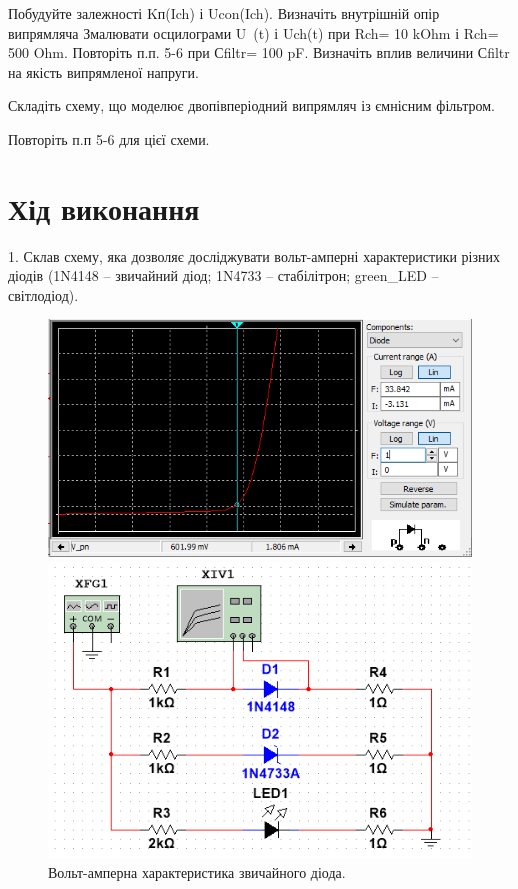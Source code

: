 \documentclass{article}
\begin{document}
\begin{normalsize}
	Побудуйте залежності Kп(Ich) і Ucon(Ich). Визначіть внутрішній опір випрямляча
	 Змалювати осцилограми U~(t) і Uch(t) при Rch= 10 kOhm і Rch= 500 Ohm.
	Повторіть п.п. 5-6 при Сfiltr= 100 pF. Визначіть вплив величини Сfiltr на якість випрямленої напруги.
	
	Складіть схему, що моделює двопівперіодний випрямляч із ємнісним фільтром.
	
	Повторіть п.п 5-6 для цієї схеми.
	
	
	\section*{Хід виконання}
	1. Склав схему, яка дозволяє досліджувати вольт-амперні характеристики різних діодів (1N4148 – звичайний діод; 1N4733 – стабілітрон; green\_LED – світлодіод).
	
	\begin{figure}[H]
		\begin{minipage}[t]{0.55\textwidth}
			\centering
			\includegraphics[width=\textwidth]{11}
		\end{minipage}
		\hfill
		\begin{minipage}[t]{0.35\textwidth}
			\centering
			\includegraphics[width=\textwidth]{12}
		\end{minipage}
		\caption{Вольт-амперна характеристика звичайного діода.}
	\end{figure}
	

\end{normalsize}
\end{document}

